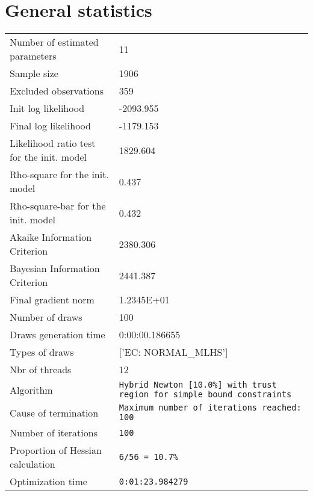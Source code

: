



\section{General statistics}
\begin{tabular}{ll}
Number of estimated parameters & 11 \\
Sample size & 1906 \\
Excluded observations & 359 \\
Init log likelihood & -2093.955 \\
Final log likelihood & -1179.153 \\
Likelihood ratio test for the init. model & 1829.604 \\
Rho-square for the init. model & 0.437 \\
Rho-square-bar for the init. model & 0.432 \\
Akaike Information Criterion & 2380.306 \\
Bayesian Information Criterion & 2441.387 \\
Final gradient norm & 1.2345E+01 \\
Number of draws & 100 \\
Draws generation time & 0:00:00.186655 \\
Types of draws & ['EC: NORMAL_MLHS'] \\
Nbr of threads & 12 \\
Algorithm & \verb$Hybrid Newton [10.0%] with trust region for simple bound constraints$ \\
Cause of termination & \verb$Maximum number of iterations reached: 100$ \\
Number of iterations & \verb$100$ \\
Proportion of Hessian calculation & \verb$6/56 = 10.7%$ \\
Optimization time & \verb$0:01:23.984279$ \\
\end{tabular}

